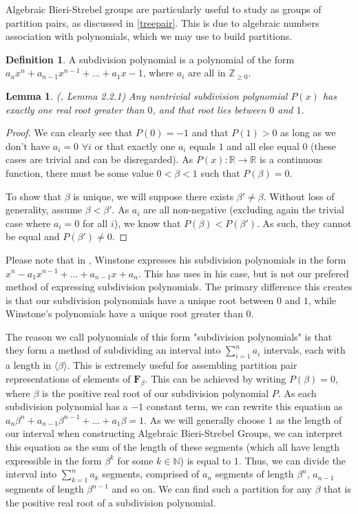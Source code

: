 \documentclass[
11pt, %
english, %
singlespacing, %
parskip, %
headsepline, %
]{amsart} %
\newtheorem{lemma}[theorem]{Lemma}
\theoremstyle{definition}
\newtheorem{definition}[theorem]{Definition}
\newcommand{\FN}[1]{$\textbf{F}_{#1}$}
\begin{document}
Algebraic Bieri-Strebel groups are particularly useful to study as groups of partition pairs, as discussed in \ref{treepair}. This is due to algebraic numbers association with polynomials, which we may use to build partitions.

\begin{definition}
A subdivision polynomial is a polynomial of the form $a_n x^n + a_{n-1} x^{n-1} +...+ a_1 x -1$, where $a_i$ are all in $\mathbb{Z}_{\geq 0}$.
\end{definition}

\begin{lemma}
(\cite{Winstone}, Lemma 2.2.1) Any nontrivial subdivision polynomial $P(x)$ has exactly one real root greater than $0$, and that root lies between $0$ and $1$.
\end{lemma}
\begin{proof}
We can clearly see that $P(0)=-1$ and that $P(1)>0$ as long as we don't have $a_i = 0$ $\forall i$ or that exactly one $a_i$ equals $1$ and all else equal $0$ (these cases are trivial and can be disregarded). As $P(x): \mathbb{R} \rightarrow \mathbb{R}$ is a continuous function, there must be some value $0 <\beta < 1$ such that $P(\beta) = 0$.
\par
To show that $\beta$ is unique, we will suppose there exists $\beta' \neq \beta$. Without loss of generality, assume $\beta < \beta'$. As $a_i$ are all non-negative (excluding again the trivial case where $a_i =0$ for all $i$), we know that $P(\beta) < P(\beta')$. As such, they cannot be equal and $P(\beta') \neq 0$.
\end{proof}

Please note that in \cite{Winstone}, Winstone expresses his subdivision polynomials in the form $x^n-a_1 x^{n-1}+...+a_{n-1} x + a_n$. This has uses in his case, but is not our prefered method of expressing subdivision polynomials. The primary difference this creates is that our subdivision polynomials have a unique root between $0$ and $1$, while Winstone's polynomials have a unique root greater than $0$.

The reason we call polynomials of this form "subdivision polynomials" is that they form a method of subdividing an interval into $\sum_{i=1}^n a_i$ intervals, each with a length in $\langle \beta \rangle$. This is extremely useful for assembling partition pair representations of elements of \FN{\beta}. This can be achieved by writing $P(\beta)=0$, where $\beta$ is the positive real root of our subdivision polynomial $P$. As each subdivision polynomial has a $-1$ constant term, we can rewrite this equation as $a_n \beta^n + a_{n-1} \beta^{n-1} +... + a_1 \beta = 1$. As we will generally choose $1$ as the length of our interval when constructing Algebraic Bieri-Strebel Groups, we can interpret this equation as the sum of the length of these segments (which all have length expressible in the form $\beta^k$ for some $k \in \mathbb{N}$) is equal to $1$. Thus, we can divide the interval into $\sum_{k=1}^n a_k$ segments, comprised of $a_n$ segments of length $\beta^n$, $a_{n-1}$ segments of length $\beta^{n-1}$ and so on. We can find such a partition for any $\beta$ that is the positive real root of a subdivision polynomial.
\end{document}

